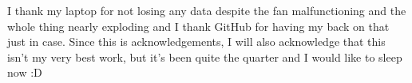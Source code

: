 \documentclass[preprint2]{aastex631}
\begin{document}

\begin{acknowledgements}
    I thank my laptop for not losing any data despite the fan malfunctioning and the whole thing nearly exploding and I thank GitHub for having my back on that just in case. Since this is acknowledgements, I will also acknowledge that this isn't my very best work, but it's been quite the quarter and I would like to sleep now :D
\end{acknowledgements}


{}
\end{document}
